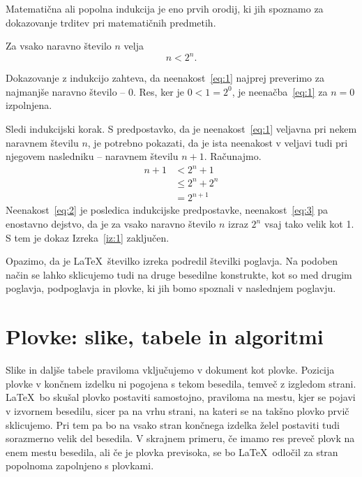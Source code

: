 \documentclass{feridiploma}
\begin{document}
	Matematična ali popolna indukcija je eno prvih orodij, ki jih spoznamo za dokazovanje trditev pri matematičnih predmetih.
	\begin{izrek}
	\label{iz:1}
	Za vsako naravno število $n$ velja
	\begin{equation}
	n < 2^n.
	\label{eq:1}
	\end{equation}
	\end{izrek}
	\begin{dokaz}
	Dokazovanje z indukcijo zahteva, da neenakost~\eqref{eq:1} najprej preverimo za najmanjše naravno število -- $0$. 
	Res, ker je $0 < 1 = 2^0$, je neenačba~\eqref{eq:1} za $n=0$ izpolnjena.
	
	Sledi indukcijski korak. S predpostavko, da je neenakost~\eqref{eq:1} veljavna pri nekem naravnem številu $n$, je potrebno pokazati, da je ista neenakost v veljavi tudi pri njegovem nasledniku -- naravnem številu $n+1$. 
	Računajmo.
	\begin{align}
	n+1 & < 2^n + 1       \label{eq:2}\\
	       & \le 2^n + 2^n \label{eq:3}\\
	       & = 2^{n+1}       \nonumber
	\end{align}
	Neenakost~\eqref{eq:2} je posledica indukcijske predpostavke, neenakost~\eqref{eq:3} pa enostavno dejstvo, da je za vsako naravno število $n$ izraz $2^n$ vsaj tako velik kot 1. 
	S tem je dokaz Izreka~\ref{iz:1} zaključen.
	\end{dokaz}
	
	Opazimo, da je \LaTeX\ številko izreka podredil številki poglavja.
	Na podoben način se lahko sklicujemo tudi na druge besedilne konstrukte, kot so med drugim poglavja, podpoglavja in plovke, ki jih bomo spoznali v naslednjem poglavju.
	
	\chapter{Plovke: slike, tabele in algoritmi}
	\label{ch2}
	
	Slike in daljše tabele praviloma vključujemo v dokument kot plovke. 
	Pozicija plovke v končnem izdelku ni pogojena s tekom besedila, temveč z izgledom strani. 
	\LaTeX\ bo skušal plovko postaviti samostojno, praviloma na mestu, kjer se pojavi v izvornem besedilu, sicer pa na 
	vrhu strani, na kateri se na takšno plovko prvič sklicujemo. 
	Pri tem pa bo na vsako stran končnega izdelka želel postaviti tudi sorazmerno velik del besedila. 
	V skrajnem primeru, če imamo res preveč plovk na enem mestu besedila, ali če je plovka previsoka, se bo \LaTeX\ odločil za stran popolnoma zapolnjeno s plovkami.
	
\end{document}
